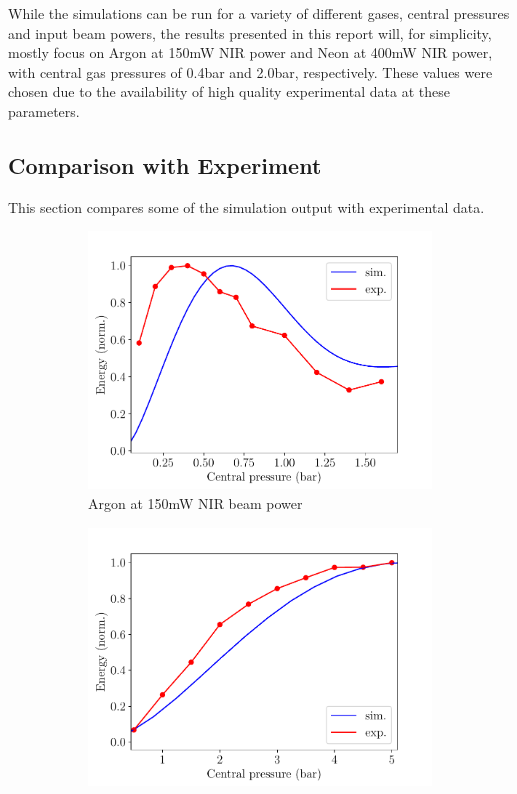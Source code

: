 \documentclass[a4paper]{jpconf}
\begin{document}
While the simulations can be run for a variety of different gases, central pressures and input beam powers, the results presented in this report will, for simplicity, mostly focus on Argon at 150mW NIR power and Neon at 400mW NIR power, with central gas pressures of 0.4bar and 2.0bar, respectively. These values were chosen due to the availability of high quality experimental data at these parameters. 

\subsection{Comparison with Experiment}
This section compares some of the simulation output with experimental data. \par 
\begin{figure}[h]
\centering
 \begin{subfigure}{0.5\textwidth}
\includegraphics[width=\textwidth]{im/energies_Ar_150mw_2.5scaled_grad}
\caption{Argon at 150mW NIR beam power}\label{im:sim_v_measured_Ar}
\end{subfigure}
 \begin{subfigure}{0.5\textwidth}
\includegraphics[width=\textwidth]{im/energies_Ne_400mw_2.5scaled_grad}

\end{subfigure}
\end{figure}
\end{document}
